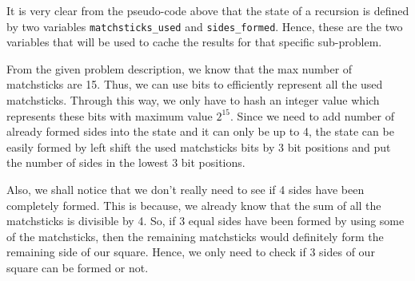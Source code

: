 It is very clear from the pseudo-code above that the state of a recursion is defined by two variables \lstinline[language=C++, basicstyle=\small\ttfamily, keywordstyle=\bfseries\color{green!40!black}]|matchsticks_used| and \lstinline[language=C++, basicstyle=\small\ttfamily, keywordstyle=\bfseries\color{green!40!black}]|sides_formed|. Hence, these are the two variables that will be used to cache the results for that specific sub-problem.

From the given problem description, we know that the max number of matchsticks are 15. Thus, we can use bits to efficiently represent all the used matchsticks. Through this way, we only have to hash an integer value which represents these bits with maximum value $2^{15}$. Since we need to add number of already formed sides into the state and it can only be up to 4, the state can be easily formed by left shift the used matchsticks bits by 3 bit positions and put the number of sides in the lowest 3 bit positions. 

Also, we shall notice that we don't really need to see if 4 sides have been completely formed. This is because, we already know that the sum of all the matchsticks is divisible by 4. So, if 3 equal sides have been formed by using some of the matchsticks, then the remaining matchsticks would definitely form the remaining side of our square. Hence, we only need to check if 3 sides of our square can be formed or not.



